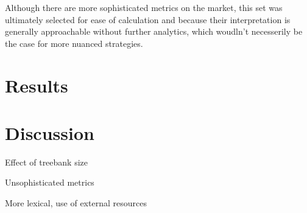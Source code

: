 \documentclass[11pt]{article}
\begin{document}
Although there are more sophisticated metrics on the market, this set was ultimately selected for ease of calculation and because their interpretation is generally approachable without further analytics, which woudln't necesserily be the case for more nuanced strategies.


\section{Results}



\section{Discussion}

Effect of treebank size

Unsophisticated metrics

More lexical, use of external resources



\appendix
\end{document}
